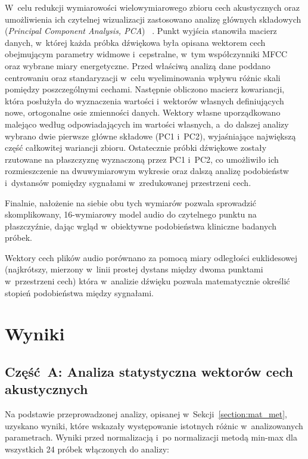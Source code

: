 \documentclass{article}
\begin{document}
W~celu redukcji wymiarowości wielowymiarowego zbioru cech akustycznych oraz umożliwienia ich czytelnej wizualizacji zastosowano analizę głównych składowych (\textit{Principal Component Analysis, PCA}) ~\cite{salimi2025evaluating, liu2023voiceprint}. Punkt wyjścia stanowiła macierz danych, w~której każda próbka dźwiękowa była opisana wektorem cech obejmującym parametry widmowe i~cepstralne, w~tym współczynniki MFCC oraz wybrane miary energetyczne. 
Przed właściwą analizą dane poddano centrowaniu oraz standaryzacji w~celu wyeliminowania wpływu różnic skali pomiędzy poszczególnymi cechami. Następnie obliczono macierz kowariancji, która posłużyła do wyznaczenia wartości i~wektorów własnych definiujących nowe, ortogonalne osie zmienności danych. Wektory własne uporządkowano malejąco według odpowiadających im wartości własnych, a~do dalszej analizy wybrano dwie pierwsze główne składowe (PC1 i~PC2), wyjaśniające największą część całkowitej wariancji zbioru. Ostatecznie próbki dźwiękowe zostały rzutowane na płaszczyznę wyznaczoną przez PC1 i~PC2, co umożliwiło ich rozmieszczenie na dwuwymiarowym wykresie oraz dalszą analizę podobieństw i~dystansów pomiędzy sygnałami w~zredukowanej przestrzeni cech.

Finalnie, nałożenie na siebie obu tych wymiarów pozwala sprowadzić skomplikowany, 16-wymiarowy model audio do czytelnego punktu na płaszczyźnie, dając wgląd w~obiektywne podobieństwa kliniczne badanych próbek.

Wektory cech plików audio porównano za pomocą miary odległości euklidesowej (najkrótszy, mierzony w~linii prostej dystans między dwoma punktami w przestrzeni cech) która w analizie dźwięku pozwala matematycznie określić stopień podobieństwa między sygnałami.


\section{Wyniki}

\subsection{Część A: Analiza statystyczna wektorów cech akustycznych}

Na podstawie przeprowadzonej analizy, opisanej w~Sekcji~\ref{section:mat_met}, uzyskano wyniki, które wskazały występowanie istotnych różnic w~analizowanych parametrach. Wyniki przed normalizacją i~po normalizacji metodą min-max dla wszystkich 24 próbek włączonych do analizy:
\end{document}
